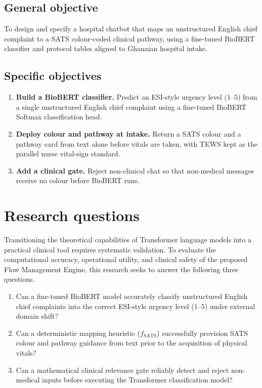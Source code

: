 \subsection{General objective}

To design and specify a hospital chatbot that maps an unstructured English chief complaint to a SATS colour-coded clinical pathway, using a fine-tuned BioBERT classifier and protocol tables aligned to Ghanaian hospital intake.

\subsection{Specific objectives}

\begin{enumerate}
\item \textbf{Build a BioBERT classifier.} Predict an ESI-style urgency level (\(1\)--\(5\)) from a single unstructured English chief complaint using a fine-tuned BioBERT Softmax classification head.
\item \textbf{Deploy colour and pathway at intake.} Return a SATS colour and a pathway card from text alone before vitals are taken, with TEWS kept as the parallel nurse vital-sign standard.
\item \textbf{Add a clinical gate.} Reject non-clinical chat so that non-medical messages receive no colour before BioBERT runs.
\end{enumerate}

\section{Research questions}
\label{sec:rqs}

Transitioning the theoretical capabilities of Transformer language models into a practical clinical tool requires systematic validation. To evaluate the computational accuracy, operational utility, and clinical safety of the proposed Flow Management Engine, this research seeks to answer the following three questions.

\begin{enumerate}
\item Can a fine-tuned BioBERT model accurately classify unstructured English chief complaints into the correct ESI-style urgency level (\(1\)--\(5\)) under external domain shift?
\item Can a deterministic mapping heuristic (\(f_{\mathrm{SATS}}\)) successfully provision SATS colour and pathway guidance from text prior to the acquisition of physical vitals?
\item Can a mathematical clinical relevance gate reliably detect and reject non-medical inputs before executing the Transformer classification model?
\end{enumerate}
